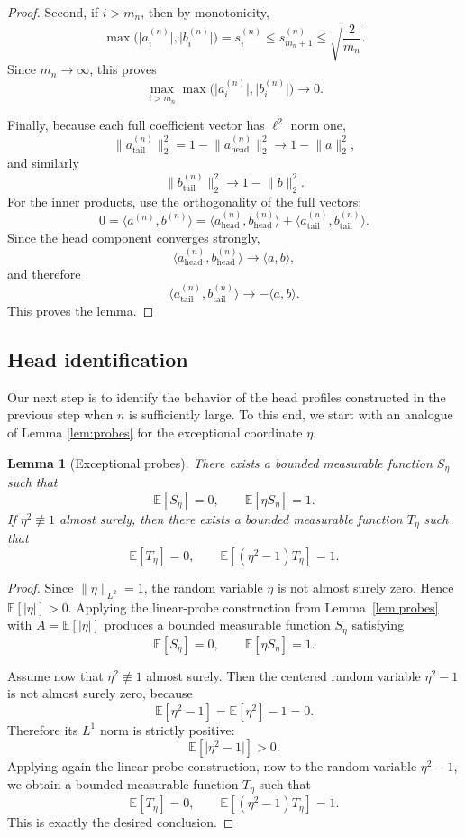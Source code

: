 \documentclass[11pt]{amsart}
\numberwithin{equation}{section}
\newtheorem{lemma}[theorem]{Lemma}
\theoremstyle{definition}
\theoremstyle{remark}
\newcommand{\E}{\mathbb E}
\newcommand{\abs}[1]{\lvert #1 \rvert}
\newcommand{\norm}[1]{\lVert #1 \rVert}
\newcommand{\ip}[2]{\langle #1,#2\rangle}
\begin{document}
\begin{proof}
Second, if $i>m_n$, then by monotonicity,
\[
\max\bigl(\abs{a_i^{(n)}},\abs{b_i^{(n)}}\bigr)
=s_i^{(n)}
\le s_{m_n+1}^{(n)}
\le \sqrt{\frac{2}{m_n}}.
\]
Since $m_n\to\infty$, this proves
\[
\max_{i>m_n}\max\bigl(\abs{a_i^{(n)}},\abs{b_i^{(n)}}\bigr)\to0.
\]

Finally, because each full coefficient vector has $\ell^2$ norm one,
\[
\norm{a_{\mathrm{tail}}^{(n)}}_2^2
=1-\norm{a_{\mathrm{head}}^{(n)}}_2^2
\longrightarrow 1-\norm{a}_2^2,
\]
and similarly
\[
\norm{b_{\mathrm{tail}}^{(n)}}_2^2
\longrightarrow 1-\norm{b}_2^2.
\]
For the inner products, use the orthogonality of the full vectors:
\[
0
=\ip{a^{(n)}}{b^{(n)}}
=\ip{a_{\mathrm{head}}^{(n)}}{b_{\mathrm{head}}^{(n)}}
+\ip{a_{\mathrm{tail}}^{(n)}}{b_{\mathrm{tail}}^{(n)}}.
\]
Since the head component converges strongly,
\[
\ip{a_{\mathrm{head}}^{(n)}}{b_{\mathrm{head}}^{(n)}}
\to \ip{a}{b},
\]
and therefore
\[
\ip{a_{\mathrm{tail}}^{(n)}}{b_{\mathrm{tail}}^{(n)}}
\to -\ip{a}{b}.
\]
This proves the lemma.
\end{proof}

\subsection{Head identification} Our next step is to identify the  behavior of the head profiles constructed in the previous step when $n$ is sufficiently large. To this end, we start with an analogue of Lemma \ref{lem:probes} for the exceptional coordinate $\eta$.

\begin{lemma}[Exceptional probes]\label{prop:exceptional-probes}
There exists a bounded measurable function $S_\eta$ such that
\[
\E[S_\eta]=0,
\qquad
\E[\eta S_\eta]=1.
\]
If $\eta^2\not\equiv1$ almost surely, then there exists a bounded measurable
function $T_\eta$ such that
\[
\E[T_\eta]=0,
\qquad
\E[(\eta^2-1)T_\eta]=1.
\]
\end{lemma}

\begin{proof}
Since $\norm{\eta}_{L^2}=1$, the random variable $\eta$ is not almost surely
zero.  Hence $\E[\abs{\eta}]>0$.  Applying the linear-probe construction from
Lemma~\ref{lem:probes} with $A=\E[\abs{\eta}]$ produces a bounded measurable
function $S_\eta$ satisfying
\[
\E[S_\eta]=0,
\qquad
\E[\eta S_\eta]=1.
\]

Assume now that $\eta^2\not\equiv1$ almost surely.  Then the centered random
variable $\eta^2-1$ is not almost surely zero, because
\[
\E[\eta^2-1]=\E[\eta^2]-1=0.
\]
Therefore its $L^1$ norm is strictly positive:
\[
\E[\abs{\eta^2-1}]>0.
\]
Applying again the linear-probe construction, now to the random variable
$\eta^2-1$, we obtain a bounded measurable function $T_\eta$ such that
\[
\E[T_\eta]=0,
\qquad
\E[(\eta^2-1)T_\eta]=1.
\]
This is exactly the desired conclusion.
\end{proof}
\end{document}
